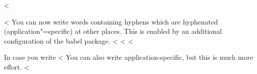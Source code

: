 <%

<%
You can now write words containing hyphens which are hyphenated (application"=specific) at other places.
This is enabled by an additional configuration of the babel package.
<%
<%
<%

In case you write <%
You can also write applica\allowbreak{}tion-specific, but this is much more effort.
<%
